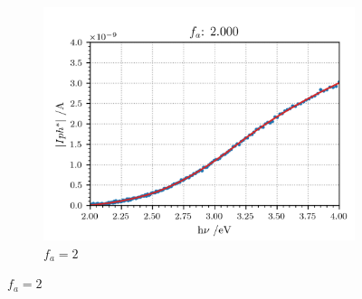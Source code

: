 \documentclass[10pt, 3p, sort&compress]{elsarticle}
\newcommand{\coef}{0.1}
\begin{document}
\begin{figure}[htbp]
\begin{subfigure}{\coef\textwidth}
	 	\includegraphics[width=\textwidth]{DSS_0mV_data-Iph-2x.png}
	 	\caption{$f_a=2$}
	 	\label{fig:fa2}
	\end{subfigure}
	

\end{figure}
\end{document}
